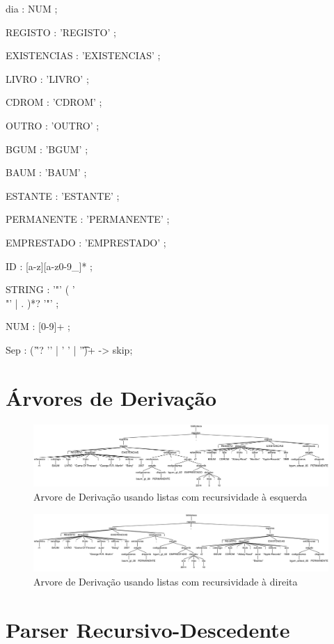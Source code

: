 \begin{spverbatim}
dia         : NUM ;

REGISTO     : 'REGISTO' ;

EXISTENCIAS : 'EXISTENCIAS' ;

LIVRO       : 'LIVRO' ;

CDROM       : 'CDROM' ;

OUTRO       : 'OUTRO' ;

BGUM        : 'BGUM' ;

BAUM        : 'BAUM' ;

ESTANTE     : 'ESTANTE' ;

PERMANENTE  : 'PERMANENTE' ;

EMPRESTADO  : 'EMPRESTADO' ;

ID          : [a-z][a-z0-9_]* ;

STRING      : '"' ( '\\"' | . )*? '"' ;

NUM         : [0-9]+ ;

Sep         :    ('\r'? '\n' | ' ' | '\t')+ -> skip;

\end{spverbatim}
\newpage
\section{Árvores de Derivação}
\begin{figure}[!h]
	\centering
    \includegraphics[angle = 90,height =0.95\paperwidth]{./imagens/alineaa.png}
    \caption{Arvore de Derivação usando listas com recursividade à esquerda}
    \label{fig:anexo_a}
\end{figure}
\begin{figure}[!h]
  \centering
    \includegraphics[angle = 90,height =0.95\paperwidth]{./imagens/alineac.png}
    \caption{Arvore de Derivação usando listas com recursividade à direita}
    \label{fig:anexo_a}
\end{figure}
\newpage
\section{Parser Recursivo-Descedente} %
\label{sec:parser_recursivo_descedente}

